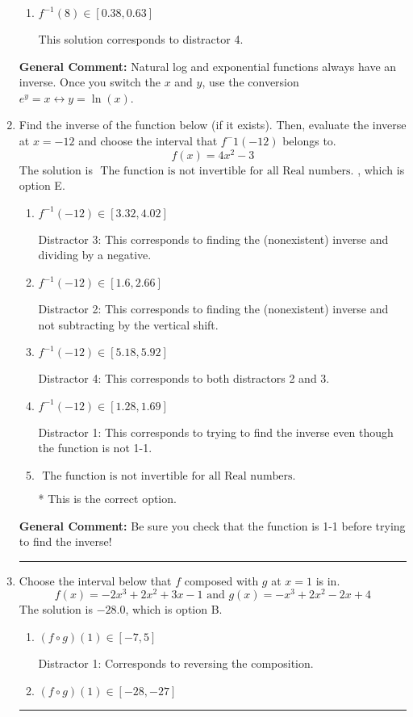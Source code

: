 \documentclass{extbook}[14pt]
\newcommand{\litem}[1]{\item #1

\rule{\textwidth}{0.4pt}}
\begin{document}
\begin{enumerate}
{\begin{enumerate}[label=\Alph*.]
 This is the solution.
\item \( f^{-1}(8) \in [0.38, 0.63] \)

 This solution corresponds to distractor 4.
\end{enumerate}

\textbf{General Comment:} Natural log and exponential functions always have an inverse. Once you switch the $x$ and $y$, use the conversion $ e^y = x \leftrightarrow y=\ln(x)$.
}
\litem{
Find the inverse of the function below (if it exists). Then, evaluate the inverse at $x = -12$ and choose the interval that $f^-1(-12)$ belongs to.
\[ f(x) = 4 x^2 - 3 \]The solution is \( \text{ The function is not invertible for all Real numbers. } \), which is option E.\begin{enumerate}[label=\Alph*.]
\item \( f^{-1}(-12) \in [3.32, 4.02] \)

 Distractor 3: This corresponds to finding the (nonexistent) inverse and dividing by a negative.
\item \( f^{-1}(-12) \in [1.6, 2.66] \)

 Distractor 2: This corresponds to finding the (nonexistent) inverse and not subtracting by the vertical shift.
\item \( f^{-1}(-12) \in [5.18, 5.92] \)

 Distractor 4: This corresponds to both distractors 2 and 3.
\item \( f^{-1}(-12) \in [1.28, 1.69] \)

 Distractor 1: This corresponds to trying to find the inverse even though the function is not 1-1. 
\item \( \text{ The function is not invertible for all Real numbers. } \)

* This is the correct option.
\end{enumerate}

\textbf{General Comment:} Be sure you check that the function is 1-1 before trying to find the inverse!
}
\litem{
Choose the interval below that $f$ composed with $g$ at $x=1$ is in.
\[ f(x) = -2x^{3} +2 x^{2} +3 x -1 \text{ and } g(x) = -x^{3} +2 x^{2} -2 x + 4 \]The solution is \( -28.0 \), which is option B.\begin{enumerate}[label=\Alph*.]
\item \( (f \circ g)(1) \in [-7, 5] \)

 Distractor 1: Corresponds to reversing the composition.
\item \( (f \circ g)(1) \in [-28, -27] \)


\end{enumerate}}
\end{enumerate}
\end{document}
